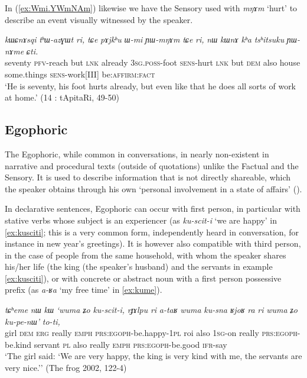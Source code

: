 \documentclass[oldfontcommands,oneside,a4paper,11pt]{article}
\newcommand{\ipa}[1]{{\phon\textit{#1}}} %
\newcommand{\refb}[1]{(\ref{#1})}
\newcommand{\factual}[1]{\textsc{:fact}}
\begin{document}
In \refb{ex:Wmi.YWmNAm} likewise we have the Sensory used with \ipa{mŋɤm} `hurt' to describe an event visually witnessed by the speaker.

\begin{exe}
\ex \label{ex:Wmi.YWmNAm}
\gll
\ipa{kɯɕnɤsqi} 	\ipa{tʰɯ-azɣɯt} 	\ipa{ri,} \ipa{tɕe} 	\ipa{pɤjkʰu} 	\ipa{ɯ-mi} 	\ipa{ɲɯ-mŋɤm} 	\ipa{tɕe} 	\ipa{ri,} 	\ipa{nɯ} 	\ipa{kɯnɤ} 	\ipa{kʰa} 	\ipa{tsʰitsuku} 	\ipa{ɲɯ-nɤme} 	\ipa{ɕti.} \\
seventy \textsc{pfv}-reach but \textsc{lnk} already \textsc{3sg.poss}-foot \textsc{sens}-hurt \textsc{lnk} but \textsc{dem} also house some.things \textsc{sens}-work[III] be:\textsc{affirm}\factual{} \\
\glt `He is seventy, his foot hurts already, but even like that he does all sorts of work at home.' (14 : tApitaRi, 49-50)
\end{exe}

 

\subsection{Egophoric} \label{sec:egophoric}
The Egophoric, while common in conversations, in nearly non-existent in narrative and procedural texts (outside of quotations) unlike the Factual and the Sensory. It is used to describe information that is not directly shareable, which the speaker obtains through his own `personal involvement in a state of affairs' (\citealt{floyd16egophoricity}). 

In declarative sentences, Egophoric can occur with first person, in particular with stative verbs whose subject is an experiencer (as \ipa{ku-scit-i} `we are happy' in \ref{ex:kusciti}; this is a very common form, independently heard in conversation, for instance in new year's greetings). It is however also compatible with third person, in the case of people from the same household, with whom the speaker shares his/her life (the king (the speaker's husband) and the servants in example \ref{ex:kusciti}), or with concrete or abstract noun with a first person possessive prefix (as \ipa{a-ʁa} `my free time' in \ref{ex:kume}).

\begin{exe}
\ex \label{ex:kusciti}
\gll
\ipa{tɕʰeme} 	\ipa{nɯ} 	\ipa{kɯ} 	\ipa{`wuma} 	\ipa{ʑo} 	\ipa{ku-scit-i,} \ipa{rɟɤlpu} 	\ipa{ri} 	\ipa{a-taʁ} 	\ipa{wuma} 	\ipa{ku-sna} \ipa{ʁjoʁ} 	\ipa{ra} 	\ipa{ri} 	\ipa{wuma} 	\ipa{ʑo} 	\ipa{ku-pe-nɯ'} \ipa{to-ti,} \\
girl \textsc{dem} \textsc{erg} really \textsc{emph} \textsc{prs:egoph}-be.happy-\textsc{1pl}  roi also \textsc{1sg}-on really \textsc{prs:egoph}-be.kind servant \textsc{pl} also really \textsc{emph}   \textsc{prs:egoph}-be.good \textsc{ifr}-say \\
\glt `The girl said: `We are very happy, the king is very kind with me, the servants are very nice.''
(The frog 2002, 122-4)
\end{exe}
\end{document}
